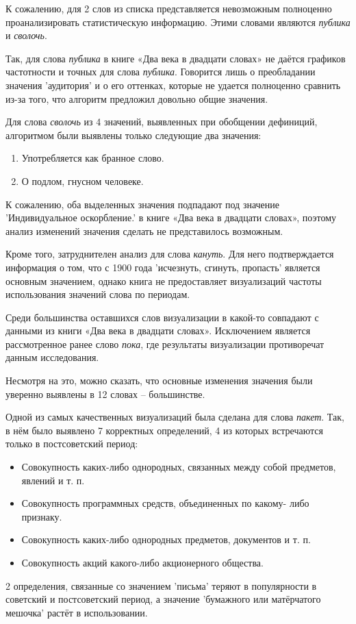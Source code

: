 \documentclass[LI,VKR]{HSEUniversity}
\begin{document}
К сожалению, для 2 слов из списка представляется невозможным полноценно проанализировать
статистическую информацию.
Этими словами являются \textit{публика} и \textit{сволочь}.

Так, для слова \textit{публика} в книге «Два века в двадцати словах» не даётся
графиков частотности и точных для слова \textit{публика}.
Говорится лишь о преобладании значения ’аудитория’ и о его оттенках,
которые не удается полноценно сравнить из-за того, что алгоритм предложил довольно общие значения.

Для слова \textit{сволочь} из 4 значений, выявленных при обобщении дефиниций,
алгоритмом были выявлены только следующие два значения:
\begin{enumerate}
    \item Употребляется как бранное слово.
    \item О подлом, гнусном человеке.
\end{enumerate}

К сожалению, оба выделенных значения подпадают под значение ’Индивидуальное оскорбление.’
в книге «Два века в двадцати словах», поэтому анализ изменений значения
сделать не представилось возможным.

Кроме того, затруднителен анализ для слова \textit{кануть}.
Для него подтверждается информация о том, что с 1900 года ’исчезнуть, сгинуть, пропасть’ является
основным значением, однако книга не предоставляет визуализаций частоты
использования значений слова по периодам.

Среди большинства оставшихся слов визуализации в какой-то совпадают с данными из книги «Два века в двадцати словах».
Исключением является рассмотренное ранее слово \textit{пока}, где результаты визуализации противоречат
данным исследования.

Несмотря на это, можно сказать, что основные изменения значения были уверенно
выявлены в 12 словах – большинстве.

Одной из самых качественных визуализаций была сделана для слова \textit{пакет}.
Так, в нём было выявлено 7 корректных определений,
4 из которых встречаются только в постсоветский период:
\begin{itemize}
    \item Совокупность каких-либо однородных, связанных между собой
предметов, явлений и т. п.
    \item Совокупность программных средств, объединенных по какому-
либо признаку.
    \item Совокупность каких-либо однородных предметов, документов и т.
п.
    \item Совокупность акций какого-либо акционерного общества.
\end{itemize}
2 определения, связанные со значением ’письма’ теряют в популярности в советский и постсоветский период,
а значение ’бумажного или матёрчатого мешочка’ растёт в использовании.
\end{document}

